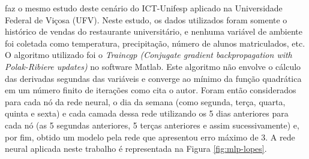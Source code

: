          faz o mesmo estudo deste cenário do ICT-Unifesp aplicado na Universidade Federal de Viçosa (UFV). Neste estudo, os dados utilizados foram somente o histórico de vendas do restaurante universitário, e nenhuma variável de ambiente foi coletada como temperatura, precipitação, número de alunos matriculados, etc. O algoritmo utilizado foi o \textit{Traincgp (Conjugate gradient backpropagation with Polak-Ribiere updates)} no software Matlab. Este algoritmo não envolve o cálculo das derivadas segundas das variáveis e converge ao mínimo da função quadrática em um número finito de iterações como cita o autor. Foram então considerados para cada nó da rede neural, o dia da semana (como segunda, terça, quarta, quinta e sexta) e cada camada dessa rede utilizando os 5 dias anteriores para cada nó (as 5 segundas anteriores, 5 terças anteriores e assim sucessivamente) e, por fim, obtido um modelo pela rede que apresentou erro máximo de 3. A rede neural aplicada neste trabalho é representada na Figura \ref{fig:mlp-lopes}.
        
        \begin{figure}[h]
        \end{figure}
        
